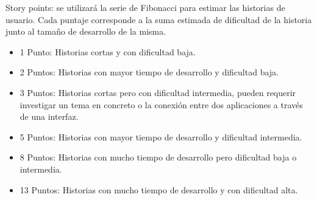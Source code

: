 \documentclass[
11pt, %
]{charter}
\begin{document}
Story points: se utilizará la serie de Fibonacci para estimar las historias de usuario. Cada puntaje corresponde a la suma estimada de dificultad de la historia junto al tamaño de desarrollo de la misma.

\begin{itemize}
	\item 1 Punto: Historias cortas y con dificultad baja.
	\item 2 Puntos: Historias con mayor tiempo de desarrollo y dificultad baja.
	\item 3 Puntos: Historias cortas pero con dificultad intermedia, pueden requerir investigar un tema en concreto o la conexión entre dos aplicaciones a través de una interfaz.
	\item 5 Puntos: Historias con mayor tiempo de desarrollo y dificultad intermedia.
	\item 8 Puntos: Historias con mucho tiempo de desarrollo pero dificultad baja o intermedia.
	\item 13 Puntos: Historias con mucho tiempo de desarrollo y con dificultad alta.
\end{itemize}
\end{document}
